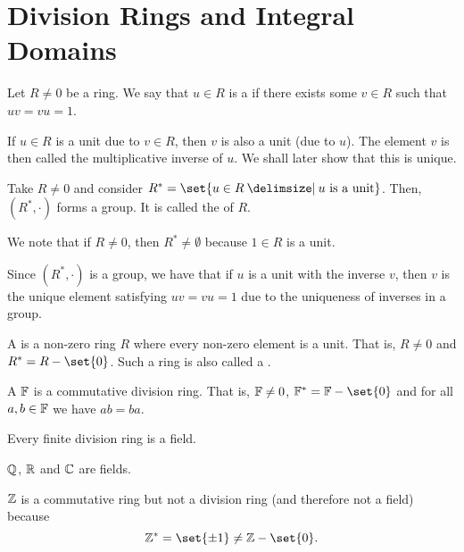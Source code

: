 \documentclass[11pt]{penrose}
\begin{document}
\section{Division Rings and Integral Domains}
\begin{ndfn}
    Let $R \neq 0$ be a ring. We say that $u \in R$ is a  if there exists some $v \in R$ such that $uv = vu = 1$.
\end{ndfn}

\begin{remark}
    If $u \in R$ is a unit due to $v \in R$, then $v$ is also a unit (due to $u$). The element $v$ is then called the multiplicative inverse of $u$. We shall later show that this is unique.
\end{remark}

\begin{nthm}
    Take $R \neq 0$ and consider $R^* = \set{u \in R \st u \text{ is a unit}}$. Then, $(R^*, \cdot)$ forms a group. It is called the  of $R$.
\end{nthm}

\begin{remark}
    We note that if $R \neq 0$, then $R^* \neq \emptyset$ because $1 \in R$ is a unit.

    Since $(R^*, \cdot)$ is a group, we have that if $u$ is a unit with the inverse $v$, then $v$ is the unique element satisfying $uv = vu = 1$ due to the uniqueness of inverses in a group.
\end{remark}

\begin{ndfn}
    A  is a non-zero ring $R$ where every non-zero element is a unit. That is, $R \neq 0$ and $R^* = R - \set{0}$. Such a ring is also called a .
\end{ndfn}

\begin{ndfn}
    A  $\mathbb{F}$ is a commutative division ring. That is, $\mathbb{F} \neq 0$, $\F^* = \F - \set{0}$ and for all $a, b \in \mathbb{F}$ we have $ab = ba$.
\end{ndfn}

\begin{nthm}
    Every finite division ring is a field.
\end{nthm}

\begin{negg}
    $\mathbb{Q}$, $\mathbb{R}$ and $\mathbb{C}$ are fields.

    $\mathbb{Z}$ is a commutative ring but not a division ring (and therefore not a field) because
    \begin{equation*}
        \Z^* = \set{\pm 1} \neq \Z - \set{0}.
    \end{equation*}
\end{negg}
\end{document}
